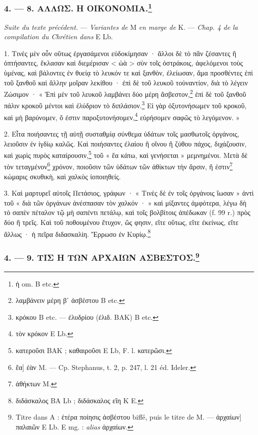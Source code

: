 \documentclass[a4paper, 11pt, oneside, polutonikogreek, french]{article}
\begin{document}
\bigskip
\centerline{\EightStarTaper}
\centerline{\EightStarTaper\EightStarTaper}
\bigskip

\subsubsection[4. --- 8. ΑΛΛΩΣ. Η ΟΙΚΟΝΟΜΙΑ.]{4. --- 8. ΑΛΛΩΣ. Η ΟΙΚΟΝΟΜΙΑ.\footnote{ἡ om. B etc.}}

\emph{Suite du texte précédent.} --- \emph{Variantes de} M \emph{en marge de} K. --- \emph{Chap. 4 de la compilation du Chrétien dans} E Lb.

1. Τινὲς μὲν οὖν οὕτως ἐργασάμενοι εὐδοκίμησαν · ἄλλοι δὲ τὸ πᾶν ζέσαντες ἢ ὀπτήσαντες, ἔκλασαν καὶ διεμέρισαν < ὡὰ > σὺν τοῖς ὀστράκοις, ἀφελόμενοι τοὺς ὑμένας, καὶ βάλοντες ἐν θυείᾳ τὸ λευκόν τε καὶ ξανθὸν, ἐλείωσαν, ἅμα προσθέντες ἐπὶ τοῦ ξανθοῦ καὶ ἄλλην μοῖραν λεκίθου · ἐπὶ δὲ τοῦ λευκοῦ τοὐναντίον, διὰ τὸ λέγειν Ζώσιμον · « Ἐπὶ μὲν τοῦ λευκοῦ λαμβάνει δύο μέρη ἄσβεστον,\footnote{λαμβάνειν μέρη βʹ ἀσβέστου B etc.} ἐπὶ δὲ τοῦ ξανθοῦ πάλιν κροκοῦ μέντοι καὶ ἐλύδριον τὸ διπλάσιον.\footnote{κρόκου B etc. --- ἐλυδρίου (ἐλιδ. BAK) B etc.} Εἰ γὰρ ὀξυτονήσωμεν τοῦ κροκοῦ, καὶ μὴ βαρύνομεν, ὅ ἐστιν παροξυτονήσομεν,\footnote{τὸν κρόκον E Lb.} εὑρήσομεν σαφῶς τὸ λεγόμενον. »

2. Εἶτα ποιήσαντες τῇ αὐτῇ συσταθμίᾳ σύνθεμα ὑδάτων τοῖς μασθωτοῖς ὀργάνοις, λειοῦσιν ἐν ἰγδίῳ καλῶς. Καὶ ποιήσαντες ἐλαίου ἢ οἴνου ἢ ζύθου πάχος, διχάζουσιν, καὶ χωρὶς πυρὸς καταίρουσιν,\footnote{κατεροῦσι BAK ; καθαιροῦσι E Lb, F. l. κατερῶσι.} τοῦ « ἔα κάτω, καὶ γενήσεται » μεμνημένοι. Μετὰ δὲ τὸν τεταγμένον\footnote{ἔα] ἐὰν M. --- Cp. Stephanus, t. 2, p. 247, l. 21 éd. Ideler.} χρόνον, ποιοῦσιν τῶν ὑδάτων τῶν ἀθίκτων τὴν ἄρσιν, ἥ ἐστιν\footnote{ἀθήκτων M.} κώμαρις σκυθικὴ, καὶ χαλκὸς ἰοποιηθείς.

3. Καὶ μαρτυρεῖ αὐτοῖς Πετάσιος, γράφων · « Τινὲς δὲ ἐν τοῖς ὀργάνοις ἴωσαν » ἀντὶ τοῦ « διὰ τῶν ὀργάνων ἀνέσπασαν τὸν χαλκόν · » καὶ μίξαντες ἀμφότερα, λέγω δὴ τὸ σαπὲν πέταλον τῷ μὴ σαπέντι πετάλῳ, καὶ τοῖς βολβίτοις ἀπέδωκαν (f. 99 r.) πρὸς δύο ἢ τρεῖς. Καὶ τοῦ ποθουμένου ἔτυχον, ὥς φησιν, εἴτε οὕτως, εἴτε ἐκείνως, εἴτε ἄλλως · ἡ πεῖρα διδασκαλίη. Ἔρρωσο ἐν Κυρίῳ.\footnote{διδάσκαλος BA Lb ; διδάσκαλος εἴη K E.}

\bigskip
\centerline{\EightStarTaper}
\centerline{\EightStarTaper\EightStarTaper}
\bigskip

\subsubsection[4. --- 9. ΤΙΣ Η ΤΩΝ ΑΡΧΑΙΩΝ ΑΣΒΕΣΤΟΣ.]{4. --- 9. ΤΙΣ Η ΤΩΝ ΑΡΧΑΙΩΝ ΑΣΒΕΣΤΟΣ.\footnote{Titre dans A : ἑτέρα ποίησις ἀσβέστου biffé, puis le titre de M. --- ἀρχαίων] παλαιῶν E Lb. E mg. : \emph{alias} ἀρχαίων.}}
\end{document}
